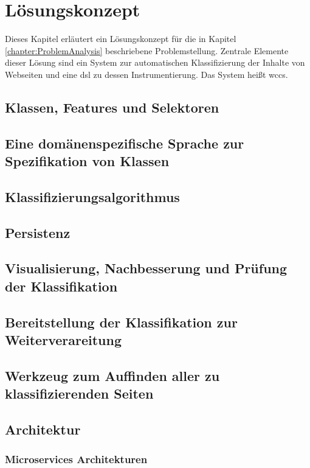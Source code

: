 \chapter{Lösungskonzept}
    \label{chapter:SolutionConcept}
    Dieses Kapitel erläutert ein Lösungskonzept für die in Kapitel \ref{chapter:ProblemAnalysis} beschriebene Problemstellung.
    Zentrale Elemente dieser Lösung sind ein System zur automatischen Klassifizierung der Inhalte von Webseiten
    und eine \gls{dsl} zu dessen Instrumentierung.
    Das System heißt \gls{wccs}.

    \section{Klassen, Features und Selektoren}
    \section{Eine domänenspezifische Sprache zur Spezifikation von Klassen}
    \section{Klassifizierungsalgorithmus}
        
    \section{Persistenz}
    \section{Visualisierung, Nachbesserung und Prüfung der Klassifikation}
    \section{Bereitstellung der Klassifikation zur Weiterverareitung}
    \section{Werkzeug zum Auffinden aller zu klassifizierenden Seiten}
    \section{Architektur}
        \label{section:Architecture}
        \subsection{Microservices Architekturen}


